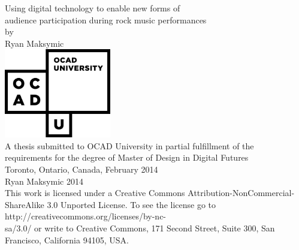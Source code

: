 \begin{titlepage}
\begin{center}

\LARGE{Using digital technology to enable new forms of\\audience participation during rock music performances}\\[0.5cm]
\large{by\\[0.5cm]
Ryan Maksymic}\\[2cm]
\includegraphics[width=0.35\textwidth]{ocadu_logo.png}\\[1.5cm]
\small
A thesis submitted to OCAD University in partial fulfillment of the\\
requirements for the degree of Master of Design in Digital Futures\\[1cm]
Toronto, Ontario, Canada, February 2014\\[1cm]
\ccLogo \hspace{0.05cm} Ryan Maksymic 2014\\
This work is licensed under a Creative Commons Attribution-NonCommercial-ShareAlike 3.0 Unported License. To see the license go to http://creativecommons.org/licenses/by-nc-\\sa/3.0/ or write to Creative Commons, 171 Second Street, Suite 300, San Francisco, California 94105, USA.

\end{center}
\end{titlepage}